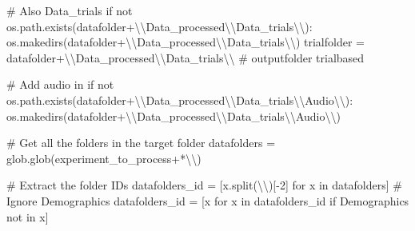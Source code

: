 \documentclass[
  letterpaper,
  DIV=11,
  numbers=noendperiod]{scrreprt}
\newenvironment{Shaded}{\begin{snugshade}}{\end{snugshade}}
\newcommand{\CharTok}[1]{\textcolor[rgb]{0.13,0.47,0.30}{#1}}
\newcommand{\CommentTok}[1]{\textcolor[rgb]{0.37,0.37,0.37}{#1}}
\newcommand{\ControlFlowTok}[1]{\textcolor[rgb]{0.00,0.23,0.31}{#1}}
\newcommand{\DecValTok}[1]{\textcolor[rgb]{0.68,0.00,0.00}{#1}}
\newcommand{\KeywordTok}[1]{\textcolor[rgb]{0.00,0.23,0.31}{#1}}
\newcommand{\NormalTok}[1]{\textcolor[rgb]{0.00,0.23,0.31}{#1}}
\newcommand{\OperatorTok}[1]{\textcolor[rgb]{0.37,0.37,0.37}{#1}}
\newcommand{\StringTok}[1]{\textcolor[rgb]{0.13,0.47,0.30}{#1}}
\begin{document}
\begin{Shaded}
\begin{Highlighting}[]
\CommentTok{\# Also Data\_trials}
\ControlFlowTok{if} \KeywordTok{not}\NormalTok{ os.path.exists(datafolder}\OperatorTok{+}\StringTok{\textquotesingle{}}\CharTok{\textbackslash{}\textbackslash{}}\StringTok{Data\_processed}\CharTok{\textbackslash{}\textbackslash{}}\StringTok{Data\_trials}\CharTok{\textbackslash{}\textbackslash{}}\StringTok{\textquotesingle{}}\NormalTok{):}
\NormalTok{    os.makedirs(datafolder}\OperatorTok{+}\StringTok{\textquotesingle{}}\CharTok{\textbackslash{}\textbackslash{}}\StringTok{Data\_processed}\CharTok{\textbackslash{}\textbackslash{}}\StringTok{Data\_trials}\CharTok{\textbackslash{}\textbackslash{}}\StringTok{\textquotesingle{}}\NormalTok{)}
\NormalTok{trialfolder }\OperatorTok{=}\NormalTok{ datafolder}\OperatorTok{+}\StringTok{\textquotesingle{}}\CharTok{\textbackslash{}\textbackslash{}}\StringTok{Data\_processed}\CharTok{\textbackslash{}\textbackslash{}}\StringTok{Data\_trials}\CharTok{\textbackslash{}\textbackslash{}}\StringTok{\textquotesingle{}} \CommentTok{\# outputfolder trialbased}


\CommentTok{\# Add audio in}
\ControlFlowTok{if} \KeywordTok{not}\NormalTok{ os.path.exists(datafolder}\OperatorTok{+}\StringTok{\textquotesingle{}}\CharTok{\textbackslash{}\textbackslash{}}\StringTok{Data\_processed}\CharTok{\textbackslash{}\textbackslash{}}\StringTok{Data\_trials}\CharTok{\textbackslash{}\textbackslash{}}\StringTok{Audio}\CharTok{\textbackslash{}\textbackslash{}}\StringTok{\textquotesingle{}}\NormalTok{):}
\NormalTok{    os.makedirs(datafolder}\OperatorTok{+}\StringTok{\textquotesingle{}}\CharTok{\textbackslash{}\textbackslash{}}\StringTok{Data\_processed}\CharTok{\textbackslash{}\textbackslash{}}\StringTok{Data\_trials}\CharTok{\textbackslash{}\textbackslash{}}\StringTok{Audio}\CharTok{\textbackslash{}\textbackslash{}}\StringTok{\textquotesingle{}}\NormalTok{)}

\CommentTok{\# Get all the folders in the target folder}
\NormalTok{datafolders }\OperatorTok{=}\NormalTok{ glob.glob(experiment\_to\_process}\OperatorTok{+}\StringTok{\textquotesingle{}*}\CharTok{\textbackslash{}\textbackslash{}}\StringTok{\textquotesingle{}}\NormalTok{)}

\CommentTok{\# Extract the folder IDs}
\NormalTok{datafolders\_id }\OperatorTok{=}\NormalTok{ [x.split(}\StringTok{\textquotesingle{}}\CharTok{\textbackslash{}\textbackslash{}}\StringTok{\textquotesingle{}}\NormalTok{)[}\OperatorTok{{-}}\DecValTok{2}\NormalTok{] }\ControlFlowTok{for}\NormalTok{ x }\KeywordTok{in}\NormalTok{ datafolders]}
\CommentTok{\# Ignore Demographics}
\NormalTok{datafolders\_id }\OperatorTok{=}\NormalTok{ [x }\ControlFlowTok{for}\NormalTok{ x }\KeywordTok{in}\NormalTok{ datafolders\_id }\ControlFlowTok{if} \StringTok{\textquotesingle{}Demographics\textquotesingle{}} \KeywordTok{not} \KeywordTok{in}\NormalTok{ x]}


\end{Highlighting}
\end{Shaded}
\end{document}
